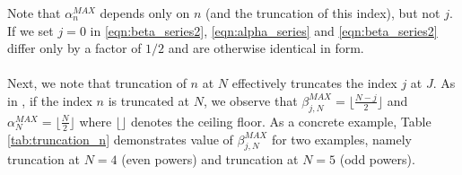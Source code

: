 Note that $\alpha_{n}^{MAX}$ depends only on $n$ (and the truncation of this index), but not $j$. If we set $j=0$ in \ref{eqn:beta_series2}, \ref{eqn:alpha_series} and \ref{eqn:beta_series2} differ only by a factor of $1/2$ and are otherwise identical in form. 
\\
\\
Next, we note that truncation of $n$ at $N$ effectively truncates the index $j$ at $J$. As in \cite{solin2014}, if the index $n$ is truncated at $N$, we observe that $\beta_{j,N}^{MAX} = \lfloor\frac{N-j}{2}\rfloor$ and $\alpha_{N}^{MAX} = \lfloor\frac{N}{2}\rfloor$  where $\lfloor \rfloor$ denotes the ceiling floor. As a concrete example, Table \ref{tab:truncation_n} demonstrates value of $\beta_{j,N}^{MAX}$ for two examples, namely truncation at $N=4$ (even powers) and truncation at $N=5$ (odd powers). 

